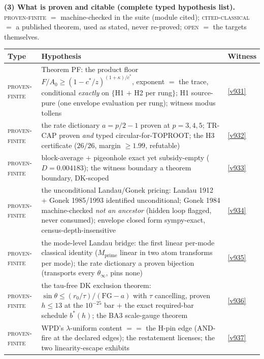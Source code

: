 \documentclass[11pt,a4paper]{article}
\begin{document}
\par\smallskip\noindent\textbf{(3) What is proven and citable (complete typed hypothesis
list).}  \textsc{proven-finite} $=$ machine-checked in the suite (module cited);
\textsc{cited-classical} $=$ a published theorem, used as stated, never re-proved;
\textsc{open} $=$ the targets themselves.
\begin{center}\footnotesize
\renewcommand{\arraystretch}{1.22}
\begin{tabularx}{\linewidth}{@{}l>{\hsize=1.45\hsize\raggedright\arraybackslash}X>{\hsize=0.55\hsize\raggedright\arraybackslash}X@{}}
\toprule
\textbf{Type} & \textbf{Hypothesis} & \textbf{Witness} \\
\midrule
\textsc{proven-finite} & Theorem PF: the product floor $F/A_0 \ge (1 - c^*/z)^{(1+\kappa)/c^*}$, exponent $=$ the trace, conditional \emph{exactly} on $\{$H1 $+$ H2 per rung$\}$; H1 source-pure (one envelope evaluation per rung); witness modus tollens & \vref{v931} \\
\textsc{proven-finite} & the rate dictionary $a = p/2 - 1$ proven at $p = 3, 4, 5$; TR-CAP proven \emph{and} typed circular-for-TOPROOT; the H3 certificate ($26/26$, margin $\ge 1.99$, refutable) & \vref{v932} \\
\textsc{proven-finite} & block-average $+$ pigeonhole exact yet subsidy-empty ($D = 0.004183$); the witness boundary a theorem boundary, DK-scoped & \vref{v933} \\
\textsc{proven-finite} & the unconditional Landau/Gonek pricing: Landau 1912 $+$ Gonek 1985/1993 identified unconditional; Gonek 1984 machine-checked \emph{not an ancestor} (hidden loop flagged, never consumed); envelope closed form sympy-exact, census-depth-insensitive & \vref{v934} \\
\textsc{proven-finite} & the mode-level Landau bridge: the first linear per-mode classical identity ($M_{\mathrm{prime}}$ linear in two atom transforms per mode); the rate dictionary a proven bijection (transports every $\theta_\infty$, pins none) & \vref{v935} \\
\textsc{proven-finite} & the tau-free DK exclusion theorem: $\sin\theta \le (r_0/\tau)/(\mathrm{FG} - a)$ with $\tau$ cancelling, proven $h \le 13$ at the $10^{-25}$ bar $+$ the exact required-bar schedule $b^*(h)$; the BA3 scale-gauge theorem & \vref{v936} \\
\textsc{proven-finite} & WPD's $\lambda$-uniform content $==$ the H-pin edge (AND-fire at the declared edges); the restatement licenses; the two linearity-escape exhibits & \vref{v937} \\

\end{tabularx}
\end{center}
\end{document}
